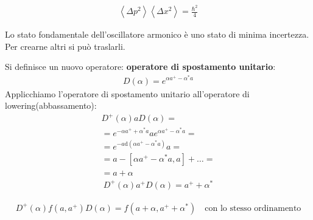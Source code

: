 \begin{equation}\begin{split}
\left\langle \Delta p^2 \right\rangle\left\langle \Delta x^2 \right\rangle=\frac{\hbar ^2}{4}
\end{split}\end{equation}

Lo stato fondamentale dell'oscillatore armonico è uno stato di minima incertezza. Per crearne altri si può traslarli.

Si definisce un nuovo operatore: \textbf{operatore di spostamento unitario}:
\begin{equation}\begin{split}
D\left(\alpha\right)=e^{\alpha a^+-\alpha^*a}
\end{split}\end{equation}
Applicchiamo l'operatore di spostamento unitario all'operatore di lowering(abbassamento):
\begin{equation}\begin{split}
D^+\left(\alpha\right)aD\left(\alpha\right)=\\
=e^{-\alpha a^++\alpha^*a}ae^{\alpha a^+-\alpha^*a}=\\
=e^{-a\textrm{d}\left(\alpha a^+-\alpha^*a\right)}a=\\
=a-\left[\alpha a^+-\alpha^*a, a\right]+\dots =\\
=a+\alpha
\end{split}\end{equation}
\begin{equation}\begin{split}
D^+\left(\alpha\right)a^+D\left(\alpha\right)=a^++\alpha^*
\end{split}\end{equation}

\begin{equation}\begin{split}
D^+\left(\alpha\right)f\left(a,a^+\right)D\left(\alpha\right)=f\left(a+\alpha,a^++\alpha^*\right) \quad \textrm{con lo stesso ordinamento}
\end{split}\end{equation}


